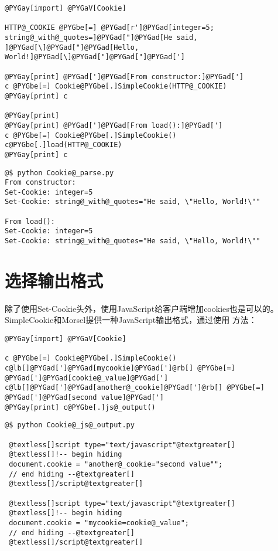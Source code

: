 \documentclass[a4paper,10pt,english]{manual}
\begin{document}
\begin{Verbatim}[commandchars=@\[\]]
@PYGay[import] @PYGaV[Cookie]

HTTP@_COOKIE @PYGbe[=] @PYGad[r']@PYGad[integer=5; string@_with@_quotes=]@PYGad["]@PYGad[He said, ]@PYGad[\]@PYGad["]@PYGad[Hello, World!]@PYGad[\]@PYGad["]@PYGad["]@PYGad[']

@PYGay[print] @PYGad[']@PYGad[From constructor:]@PYGad[']
c @PYGbe[=] Cookie@PYGbe[.]SimpleCookie(HTTP@_COOKIE)
@PYGay[print] c

@PYGay[print]
@PYGay[print] @PYGad[']@PYGad[From load():]@PYGad[']
c @PYGbe[=] Cookie@PYGbe[.]SimpleCookie()
c@PYGbe[.]load(HTTP@_COOKIE)
@PYGay[print] c
\end{Verbatim}

\begin{Verbatim}[commandchars=@\[\]]
@$ python Cookie@_parse.py
From constructor:
Set-Cookie: integer=5
Set-Cookie: string@_with@_quotes="He said, \"Hello, World!\""

From load():
Set-Cookie: integer=5
Set-Cookie: string@_with@_quotes="He said, \"Hello, World!\""
\end{Verbatim}


\section{选择输出格式}

除了使用Set-Cookie头外，使用JavaScript给客户端增加cookies也是可以的。SimpleCookie和Morsel提供一种JavaScript输出格式，通过使用  方法：

\begin{Verbatim}[commandchars=@\[\]]
@PYGay[import] @PYGaV[Cookie]

c @PYGbe[=] Cookie@PYGbe[.]SimpleCookie()
c@lb[]@PYGad[']@PYGad[mycookie]@PYGad[']@rb[] @PYGbe[=] @PYGad[']@PYGad[cookie@_value]@PYGad[']
c@lb[]@PYGad[']@PYGad[another@_cookie]@PYGad[']@rb[] @PYGbe[=] @PYGad[']@PYGad[second value]@PYGad[']
@PYGay[print] c@PYGbe[.]js@_output()
\end{Verbatim}

\begin{Verbatim}[commandchars=@\[\]]
@$ python Cookie@_js@_output.py

 @textless[]script type="text/javascript"@textgreater[]
 @textless[]!-- begin hiding
 document.cookie = "another@_cookie="second value"";
 // end hiding --@textgreater[]
 @textless[]/script@textgreater[]

 @textless[]script type="text/javascript"@textgreater[]
 @textless[]!-- begin hiding
 document.cookie = "mycookie=cookie@_value";
 // end hiding --@textgreater[]
 @textless[]/script@textgreater[]
\end{Verbatim}
\end{document}
